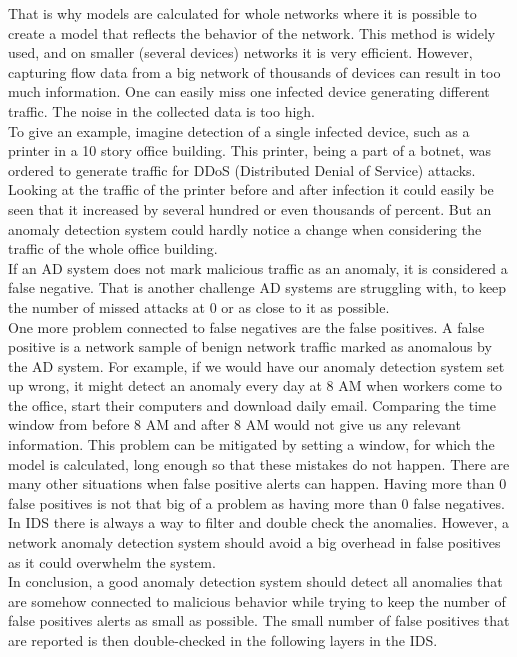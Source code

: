 \documentclass[thesis=B,english]{FITthesis}[2012/10/20]
\begin{document}
That is why models are calculated for whole networks where it is possible to create a model that reflects the behavior of the network.
This method is widely used, and on smaller (several devices) networks it is very efficient.
However, capturing flow data from a big network of thousands of devices can result in too much information.
One can easily miss one infected device generating different traffic.
The noise in the collected data is too high. \\

To give an example, imagine detection of a single infected device, such as a printer in a 10 story office building.
This printer, being a part of a botnet, was ordered to generate traffic for DDoS (Distributed Denial of Service) attacks.
Looking at the traffic of the printer before and after infection it could easily be seen that it increased by several hundred or even thousands of percent.
But an anomaly detection system could hardly notice a change when considering the traffic of the whole office building. \\

If an AD system does not mark malicious traffic as an anomaly, it is considered a false negative.
That is another challenge AD systems are struggling with, to keep the number of missed attacks at 0 or as close to it as possible.\\

One more problem connected to false negatives are the false positives.
A false positive is a network sample of benign network traffic marked as anomalous by the AD system.
For example, if we would have our anomaly detection system set up wrong, it might detect an anomaly every day at 8 AM when workers come to the office, start their computers and download daily email.
Comparing the time window from before 8 AM and after 8 AM would not give us any relevant information.
This problem can be mitigated by setting a window, for which the model is calculated, long enough so that these mistakes do not happen.
There are many other situations when false positive alerts can happen.
Having more than 0 false positives is not that big of a problem as having more than 0 false negatives.
In IDS there is always a way to filter and double check the anomalies.
However,  a network anomaly detection system should avoid a big overhead in false positives as it could overwhelm the system.\\

In conclusion, a good anomaly detection system should detect all anomalies that are somehow connected to malicious behavior while trying to keep the number of false positives alerts as small as possible.
The small number of false positives that are reported is then double-checked in the following layers in the IDS.
\end{document}
